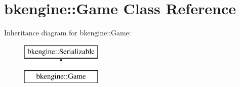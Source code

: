 \hypertarget{classbkengine_1_1Game}{}\section{bkengine\+:\+:Game Class Reference}
\label{classbkengine_1_1Game}
Inheritance diagram for bkengine\+:\+:Game\+:\begin{figure}[H]
\begin{center}
\leavevmode
\includegraphics[height=2.000000cm]{classbkengine_1_1Game}
\end{center}
\end{figure}

